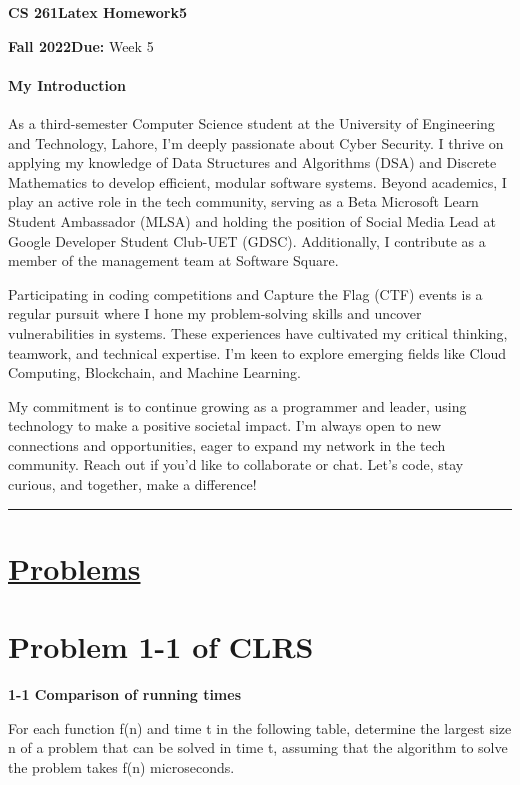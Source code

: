 \documentclass[12pt]{article}
\newcommand{\HWNum}{5}
\newcommand{\Rule}{\rule{\linewidth}{0.5pt}}
\begin{document}
	\begin{tcolorbox}
		\textbf{CS 261}\hfill\textbf{Latex Homework\HWNum{}}

		\textbf{Fall 2022}\hfill\textbf{Due:} Week 5
	\end{tcolorbox}

	\paragraph{My Introduction} As a third-semester Computer Science student at the University of Engineering and Technology, Lahore, I'm deeply passionate about Cyber Security. I thrive on applying my knowledge of Data Structures and Algorithms (DSA) and Discrete Mathematics to develop efficient, modular software systems. Beyond academics, I play an active role in the tech community, serving as a Beta Microsoft Learn Student Ambassador (MLSA) and holding the position of Social Media Lead at Google Developer Student Club-UET (GDSC). Additionally, I contribute as a member of the management team at Software Square.

Participating in coding competitions and Capture the Flag (CTF) events is a regular pursuit where I hone my problem-solving skills and uncover vulnerabilities in systems. These experiences have cultivated my critical thinking, teamwork, and technical expertise. I'm keen to explore emerging fields like Cloud Computing, Blockchain, and Machine Learning.

My commitment is to continue growing as a programmer and leader, using technology to make a positive societal impact. I'm always open to new connections and opportunities, eager to expand my network in the tech community. Reach out if you'd like to collaborate or chat. Let's code, stay curious, and together, make a difference!


	\Rule

	\section*{\underline{Problems}}
 
    \section*{Problem 1-1 of CLRS}
    \textbf{1-1 Comparison of running times} \par
    For each function f(n) and time t in the following table, determine the largest size n of a problem that can be solved in time t, assuming that the algorithm to solve the problem takes f(n) microseconds.
\end{document}
